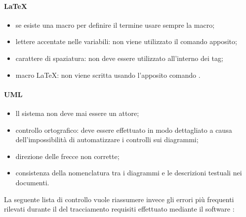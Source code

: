 \documentclass[12pt,a4paper]{article}
\begin{document}
\paragraph{LaTeX}
\begin{itemize}
	\item se esiste una macro per definire il termine usare sempre la macro;
	\item lettere accentate nelle variabili: non viene utilizzato il comando apposito; 
	\item carattere di spaziatura: non deve essere utilizzato all'interno dei tag; 
	\item macro \LaTeX{}: non viene scritta usando l’apposito comando . 
\end{itemize}


\paragraph{UML}
\begin{itemize}
	\item ll sistema non deve mai essere un attore; 
	\item controllo ortografico: deve essere effettuato in modo dettagliato a causa dell'impossibilità di automatizzare i controlli sui diagrammi; 
	\item direzione delle frecce non corrette; 
	\item consistenza della nomenclatura tra i diagrammi e le descrizioni testuali nei documenti. 
\end{itemize}

La seguente lista di controllo vuole riassumere invece gli  errori più frequenti rilevati durante il  del tracciamento requisiti effettuato mediante il software :
\end{document}
